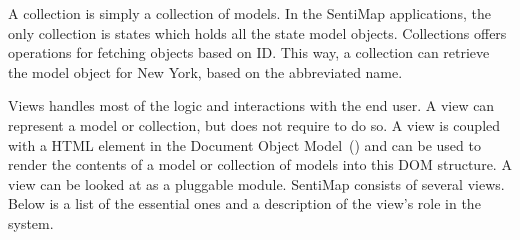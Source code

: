 A collection is simply a collection of models. In the SentiMap applications, the only collection is states which holds all the state model objects. Collections offers operations for fetching objects based on ID. This way, a collection can retrieve the model object for New York, based on the abbreviated name. 

Views handles most of the logic and interactions with the end user. A view can represent a model or collection, but does not require to do so. A view is coupled with a HTML element in the Document Object Model~() and can be used to render the contents of a model or collection of models into this DOM structure. A view can be looked at as a pluggable module. SentiMap consists of several views. Below is a list of the essential ones and a description of the view's role in the system.

